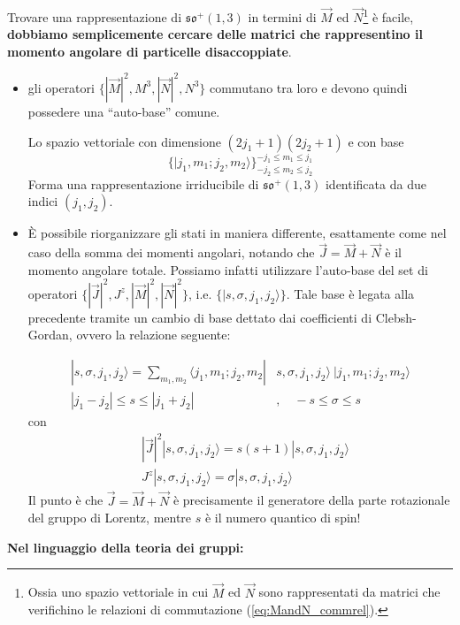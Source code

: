 \documentclass[../main.tex]{subfiles}
\begin{document}
Trovare una rappresentazione di $\mathfrak{so}^+(1,3)$ in termini di $\Vec M$ ed $\Vec{N}$\footnote{Ossia uno spazio vettoriale in cui $\Vec M$ ed $\Vec{N}$ sono rappresentati da matrici che verifichino le relazioni di commutazione (\ref{eq:MandN_commrel}).} è facile, \textbf{dobbiamo semplicemente cercare delle matrici che rappresentino il momento angolare di particelle disaccoppiate}.
\begin{itemize}
    \item gli operatori $\big\{ |\Vec M|^2, M^3, |\Vec N|^2, N^3 \big\}$ commutano tra loro e devono quindi possedere una “auto-base” comune.

    Lo spazio vettoriale con dimensione $(2j_1+1)(2j_2+1)$ e con base 
    \[
    \big\{ | j_1, m_1; j_2,m_2 \rangle \big\}^{-j_1\leq m_1\leq j_1}_{-j_2\leq m_2\leq j_2}
    \]
    Forma una rappresentazione irriducibile di $\mathfrak{so}^+(1,3)$ identificata da due indici $(j_1, j_2)$.

    \item È possibile riorganizzare gli stati in maniera differente, esattamente come nel caso della somma dei momenti angolari, notando che $\Vec J = \Vec M + \Vec N $ è il momento angolare totale. Possiamo infatti utilizzare l'auto-base del set di operatori $\big\{|\Vec J|^2, J^z, |\Vec M|^2, |\Vec N|^2 \big\}$, i.e. \(\big\{ | s, \sigma, j_1, j_2 \rangle \big\}\). Tale base è legata alla precedente tramite un cambio di base dettato dai coefficienti di Clebsh-Gordan, ovvero la relazione seguente:

    \[
    \boxed{
    \begin{aligned}
        | s, \sigma, j_1, j_2 \rangle = \sum_{m_1,m_2} \langle j_1, m_1; j_2, m_2|& s, \sigma, j_1, j_2 \rangle~| j_1, m_1; j_2, m_2 \rangle\\
        |j_1 - j_2|\leq s \leq|j_1 + j_2|~&, \quad -s \leq \sigma \leq s
    \end{aligned}}
    \]
    con
    \[
    \boxed{\begin{aligned}
        &|\Vec J|^2| s, \sigma, j_1, j_2 \rangle = s(s+1)| s, \sigma, j_1, j_2 \rangle\\
        &J^z| s, \sigma, j_1, j_2 \rangle = \sigma| s, \sigma, j_1, j_2 \rangle
    \end{aligned}}
    \]
    Il punto è che $\Vec J = \Vec M + \Vec N $ è precisamente il generatore della parte rotazionale del gruppo di Lorentz, mentre $s$ è il numero quantico di spin!
\end{itemize}
\textbf{Nel linguaggio della teoria dei gruppi:}
\end{document}
